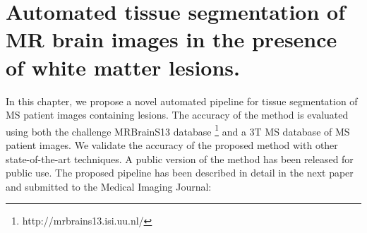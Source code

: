 
\chapter{Automated tissue segmentation of MR brain images in the presence of white
matter lesions.}  

\label{chapter:chapter_6}

In this chapter, we propose a novel automated pipeline for tissue segmentation of 
MS patient images containing lesions. The accuracy of the method is evaluated using both the challenge MRBrainS13 database \footnote{http://mrbrains13.isi.uu.nl/} and a 3T MS database of MS patient images. We validate the accuracy of the proposed method with other state-of-the-art techniques. A public version of the method has been released for public use.  The proposed pipeline has been described in detail in the next paper and submitted to the Medical Imaging Journal:

\vspace{2cm}

\noindent{}





